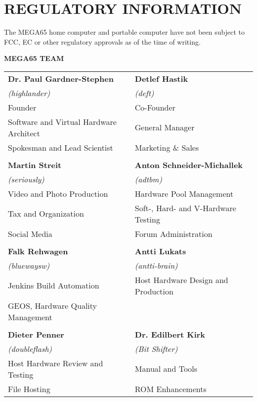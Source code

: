 \chapter*{REGULATORY INFORMATION}

The MEGA65 home computer and portable computer have not been subject to FCC, EC
or other regulatory approvals as of the time of writing.


\newpage
{\Huge\bfseries MEGA65 TEAM} \\[6mm]
\setlength{\tabcolsep}{1mm}
\begin{tabular}{ll}

{\large\bf Dr. Paul Gardner-Stephen}    & {\large\bf Detlef Hastik} \\
\textit{(highlander)}                   & \textit{(deft)} \\
Founder                                 & Co-Founder \\
Software and Virtual Hardware Architect & General Manager \\
Spokesman and Lead Scientist            & Marketing \& Sales \\
& \\
{\large\bf Martin Streit}               & {\large\bf Anton Schneider-Michallek} \\
 \textit{(seriously)}                   & \textit{(adtbm)} \\
Video and Photo Production              & Hardware Pool Management \\
Tax and Organization                    & Soft-, Hard- and V-Hardware Testing \\
Social Media                            & Forum Administration \\
& \\
{\large\bf Falk Rehwagen}               & {\large\bf Antti Lukats} \\
 \textit{(bluewaysw)}                   & \textit{(antti-brain)} \\
Jenkins Build Automation                & Host Hardware Design and Production \\
GEOS, Hardware Quality Management       & \\
& \\
{\large\bf Dieter Penner}               & {\large\bf Dr. Edilbert Kirk} \\
 \textit{(doubleflash)}                 & \textit{(Bit Shifter)} \\
Host Hardware Review and Testing        & Manual and Tools \\
File Hosting                            & ROM Enhancements \\

\end{tabular}
